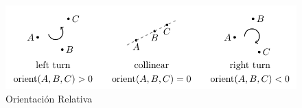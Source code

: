 \begin{itemize}
{		\begin{figure}
			\centering
				\includegraphics{imag/orient}
			\caption{Orientaci\'on Relativa}
			\label{fig:orienta}
		\end{figure}  
    }
\end{itemize}

